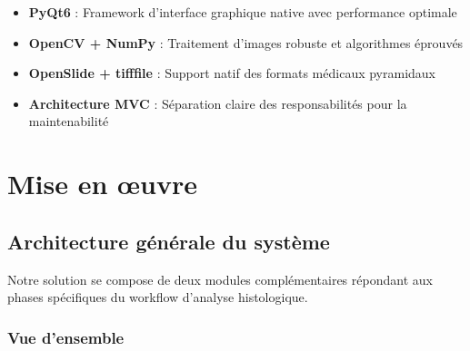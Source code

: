 \documentclass[11pt,a4paper]{report}
\begin{document}
\begin{itemize}
\item \textbf{PyQt6} : Framework d'interface graphique native avec performance optimale
\item \textbf{OpenCV + NumPy} : Traitement d'images robuste et algorithmes éprouvés
\item \textbf{OpenSlide + tifffile} : Support natif des formats médicaux pyramidaux
\item \textbf{Architecture MVC} : Séparation claire des responsabilités pour la maintenabilité
\end{itemize}

\newpage

\chapter{Mise en œuvre}

\section{Architecture générale du système}

Notre solution se compose de deux modules complémentaires répondant aux phases spécifiques du workflow d'analyse histologique.

\subsection{Vue d'ensemble}
\end{document}
